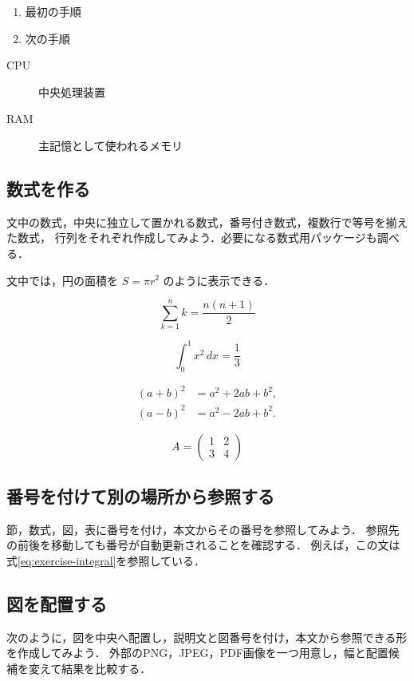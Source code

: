 \documentclass[a4paper,11pt]{jsarticle}
\begin{document}
\begin{enumerate}
  \item 最初の手順
  \item 次の手順
\end{enumerate}

\begin{description}
  \item[CPU] 中央処理装置
  \item[RAM] 主記憶として使われるメモリ
\end{description}

\subsection{数式を作る}

文中の数式，中央に独立して置かれる数式，番号付き数式，複数行で等号を揃えた数式，
行列をそれぞれ作成してみよう．必要になる数式用パッケージも調べる．

文中では，円の面積を $S=\pi r^2$ のように表示できる．

\[
  \sum_{k=1}^{n} k = \frac{n(n+1)}{2}
\]

\begin{equation}
  \int_0^1 x^2\,dx = \frac{1}{3}
  \label{eq:exercise-integral}
\end{equation}

\begin{align}
  (a+b)^2 &= a^2+2ab+b^2, \\
  (a-b)^2 &= a^2-2ab+b^2.
\end{align}

\[
A=
\begin{pmatrix}
  1 & 2 \\
  3 & 4
\end{pmatrix}
\]

\subsection{番号を付けて別の場所から参照する}

節，数式，図，表に番号を付け，本文からその番号を参照してみよう．
参照先の前後を移動しても番号が自動更新されることを確認する．
例えば，この文は式\ref{eq:exercise-integral}を参照している．

\subsection{図を配置する}

次のように，図を中央へ配置し，説明文と図番号を付け，本文から参照できる形を作成してみよう．
外部のPNG，JPEG，PDF画像を一つ用意し，幅と配置候補を変えて結果を比較する．
\end{document}
